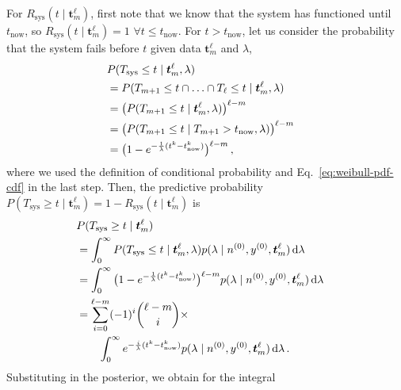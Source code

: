 \documentclass[12pt,a4paper,twocolumn,fleqn]{narms}
\newcommand{\dd}{\,\mathrm{d}}
\renewcommand{\vec}[1]{{\bm#1}}
\newcommand{\uz}{^{(0)}} %
\def\yz{y\uz}
\def\nz{n\uz}
\begin{document}
For $R_\text{sys}(t \mid \vec{t}_m^\ell)$, first note that we know that the system has functioned until $t_\text{now}$,
so $R_\text{sys}(t \mid \vec{t}_m^\ell) = 1$ $\forall t \leq t_\text{now}$.
For $t > t_\text{now}$, let us consider the probability
that the system fails before $t$ given data $\vec{t}_m^\ell$ and $\lambda$,
\begin{align}
\lefteqn{P(T_\text{sys} \leq t \mid \vec{t}_m^\ell, \lambda)} \\ 
 &= P(T_{m+1}\leq t \cap \ldots \cap T_\ell \leq t \mid \vec{t}_m^\ell, \lambda) \\
 &= \big( P(T_{m+1} \leq t \mid \vec{t}_m^\ell, \lambda) \big)^{\ell-m} \\
 &= \big( P(T_{m+1} \leq t \mid T_{m+1} > t_\text{now}, \lambda) \big)^{\ell-m} \\
 &= \big( 1 - e^{-\frac{1}{\lambda} (t^k - t_\text{now}^k)} \big)^{\ell-m}\,,
\end{align}
where we used the definition of conditional probability
and Eq.~\eqref{eq:weibull-pdf-cdf} in the last step.
%
Then, the predictive probability
$P(T_\text{sys} \geq t \mid \vec{t}_m^\ell) = 1 - R_\text{sys}(t \mid \vec{t}_m^\ell)$ is
\begin{align}
\lefteqn{P(T_\text{sys} \geq t \mid \vec{t}_m^\ell)} \\
 &= \int_0^\infty P(T_\text{sys} \leq t \mid \vec{t}_m^\ell, \lambda)
    p(\lambda \mid \nz, \yz, \vec{t}_m^\ell) \dd\lambda \\
 &= \int_0^\infty \big( 1 - e^{-\frac{1}{\lambda} (t^k - t_\text{now}^k)} \big)^{\ell-m}
    p(\lambda \mid \nz, \yz, \vec{t}_m^\ell) \dd\lambda \\
 &=\sum_{i=0}^{\ell-m} (-1)^i {\ell-m \choose i} \times \\ 
 & \qquad
    \int_0^\infty e^{-\frac{i}{\lambda} (t^k - t_\text{now}^k)}
    p(\lambda \mid \nz, \yz, \vec{t}_m^\ell) \dd\lambda \,.
\end{align}
Substituting in the posterior, we obtain for the integral
\end{document}
